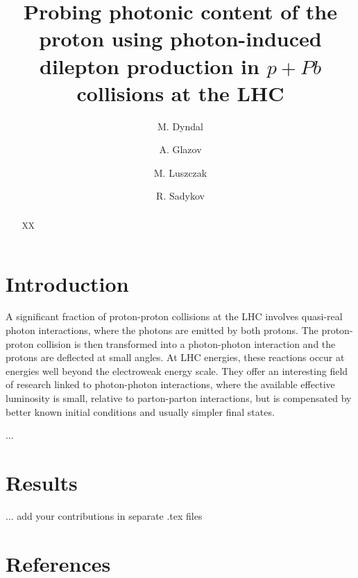 \documentclass[preprint,10pt]{elsarticle}
\begin{document}
\begin{frontmatter}
\title{Probing photonic content of the proton using photon-induced dilepton production in $p+Pb$ collisions at the LHC}


\author{M. Dyndal}
\address{DESY}
\author{A. Glazov}
\address{DESY}
\author{M. Luszczak}
\address{...}
\author{R. Sadykov}
\address{...}



\begin{abstract}
XX
\end{abstract}



\end{frontmatter}


\section{Introduction}

A significant fraction of proton-proton collisions at the LHC involves quasi-real photon interactions,
where the photons are emitted by both protons. The proton-proton collision is then transformed into a photon-photon interaction
and the protons are deflected at small angles. At LHC energies, these reactions
 occur at
energies well beyond the electroweak energy scale. They offer an interesting field of research linked to photon-photon interactions,
 where the available effective luminosity is small, relative to parton-parton interactions, but is compensated
by better known initial conditions and usually simpler final states. 

...~\cite{Chatrchyan:2011ci}


\section{Results}

... add your contributions in separate .tex files


\section*{References}


\end{document}
